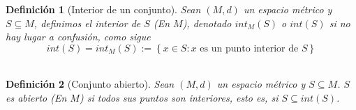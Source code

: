 \documentclass[oneside]{book} %
\theoremstyle{Teorema}
\newtheorem{Definicion}{Definición}[chapter]
\theoremstyle{Ejemplos}
\theoremstyle{[Obs]}
\renewcommand{\{}{\left\lbrace} %
\renewcommand{\}}{\right\rbrace} %
\renewcommand{\sc}{\subseteq} %
\begin{document}
			\begin{Definicion}[Interior de un conjunto]\setlength{\parindent}{0em}

				Sean $(M, d)$ un espacio métrico y $S \sc M$, definimos el interior de $S$ (En $M$), denotado $int_{M}(S)$ o $int(S)$ si no hay lugar a confusión, como sigue \\

				\[ int(S) = int_{M}(S) := \{ x \in S : x \text{ es un punto interior de } S \} \] \\

			\end{Definicion}

			\begin{Definicion}[Conjunto abierto]\setlength{\parindent}{0em}

				Sean $(M, d)$ un espacio métrico y $S \sc M$. $S$ es abierto (En $M$) si todos sus puntos son interiores, esto es, si $S \sc int(S)$. \\

			\end{Definicion}
\end{document}
